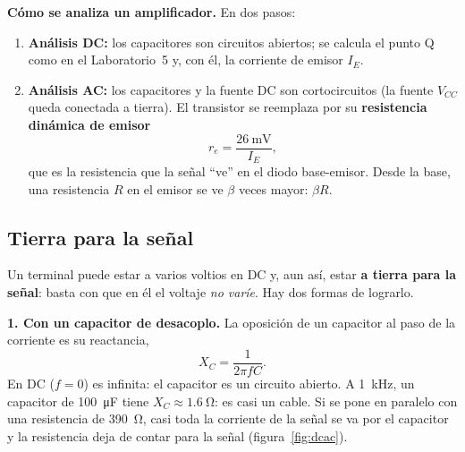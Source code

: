 \documentclass[11pt,a4paper]{article}
\begin{document}
\noindent\textbf{Cómo se analiza un amplificador.} En dos pasos:
\begin{enumerate}[label=\arabic*), leftmargin=*, itemsep=4pt]
  \item \textbf{Análisis DC:} los capacitores son circuitos abiertos; se calcula el punto Q
        como en el Laboratorio~5 y, con él, la corriente de emisor $I_E$.
  \item \textbf{Análisis AC:} los capacitores y la fuente DC son cortocircuitos (la fuente
        $V_{CC}$ queda conectada a tierra). El transistor se reemplaza por su
        \textbf{resistencia dinámica de emisor}
        \begin{equation}
          r_e = \frac{\qty{26}{\milli\volt}}{I_E},
          \label{eq:re}
        \end{equation}
        que es la resistencia que la señal ``ve'' en el diodo base-emisor. Desde la base, una
        resistencia $R$ en el emisor se ve $\beta$ veces mayor: $\beta R$.
\end{enumerate}

\subsection{Tierra para la señal}
\label{sec:tierra}
Un terminal puede estar a varios voltios en DC y, aun así, estar \textbf{a tierra para la
señal}: basta con que en él el voltaje \emph{no varíe}. Hay dos formas de lograrlo.

\noindent\textbf{1. Con un capacitor de desacoplo.} La oposición de un capacitor al paso de la
corriente es su reactancia,
\begin{equation}
  X_C = \frac{1}{2\pi f C}.
  \label{eq:xc}
\end{equation}
En DC ($f = 0$) es infinita: el capacitor es un circuito abierto. A \qty{1}{\kilo\hertz}, un
capacitor de \qty{100}{\micro\farad} tiene $X_C \approx \qty{1.6}{\ohm}$: es casi un cable. Si
se pone en paralelo con una resistencia de \qty{390}{\ohm}, casi toda la corriente de la señal
se va por el capacitor y la resistencia deja de contar para la señal
(figura~\ref{fig:dcac}).
\end{document}
